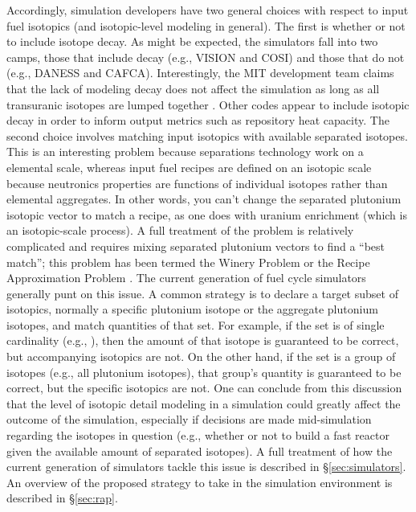Accordingly, simulation developers have two general choices with respect to
input fuel isotopics (and isotopic-level modeling in general). The first is
whether or not to include isotope decay. As might be expected, the simulators
fall into two camps, those that include decay (e.g., VISION and COSI) and those
that do not (e.g., DANESS and CAFCA). Interestingly, the MIT development team
claims that the lack of modeling decay does not affect the simulation as long as
all transuranic isotopes are lumped together \cite{guerin_impact_2009}. Other
codes appear to include isotopic decay in order to inform output metrics such as
repository heat capacity. The second choice involves matching input isotopics
with available separated isotopes. This is an interesting problem because
separations technology work on a elemental scale, whereas input fuel recipes are
defined on an isotopic scale because neutronics properties are functions of
individual isotopes rather than elemental aggregates. In other words, you can't
change the separated plutonium isotopic vector to match a recipe, as one does
with uranium enrichment (which is an isotopic-scale process). A full treatment
of the problem is relatively complicated and requires mixing separated plutonium
vectors to find a ``best match''; this problem has been termed the Winery
Problem or the Recipe Approximation Problem \cite{oliver_geniusv2:_2009}. The
current generation of fuel cycle simulators generally punt on this issue. A
common strategy is to declare a target subset of isotopics, normally a specific
plutonium isotope or the aggregate plutonium isotopes, and match quantities of
that set. For example, if the set is of single cardinality (e.g.,
), then the amount of that isotope is guaranteed to be correct,
but accompanying isotopics are not. On the other hand, if the set is a group of
isotopes (e.g., all plutonium isotopes), that group's quantity is guaranteed to
be correct, but the specific isotopics are not. One can conclude from this
discussion that the level of isotopic detail modeling in a simulation could
greatly affect the outcome of the simulation, especially if decisions are made
mid-simulation regarding the isotopes in question (e.g., whether or not to build
a fast reactor given the available amount of separated isotopes). A full
treatment of how the current generation of simulators tackle this issue is
described in \S\ref{sec:simulators}. An overview of the proposed strategy to
take in the \Cyclus simulation environment is described in \S\ref{sec:rap}.

